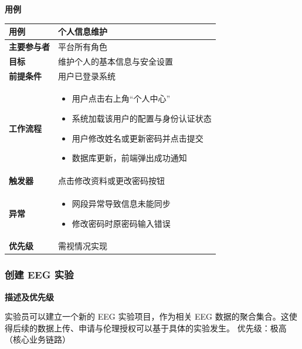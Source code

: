 \textbf{用例}
\begin{table}[H]
    \centering
    \begin{tabular}{|p{3cm}|p{11.5cm}|}
        \hline
        \textbf{用例} & 个人信息维护 \\
        \hline
        \textbf{主要参与者} & 平台所有角色 \\
        \hline
        \textbf{目标} & 维护个人的基本信息与安全设置 \\
        \hline
        \textbf{前提条件} & 用户已登录系统 \\
        \hline
        \textbf{工作流程} & 
        \vspace{-0.3cm}
        \begin{itemize}
            \item 用户点击右上角“个人中心”
            \item 系统加载该用户的配置与身份认证状态
            \item 用户修改姓名或更新密码并点击提交
            \item 数据库更新，前端弹出成功通知
        \end{itemize} \vspace{-0.3cm} \\
        \hline
        \textbf{触发器} & 点击修改资料或更改密码按钮 \\
        \hline
        \textbf{异常} &
        \vspace{-0.3cm}
        \begin{itemize}
            \item 网段异常导致信息未能同步
            \item 修改密码时原密码输入错误
        \end{itemize} \vspace{-0.3cm} \\
        \hline
        \textbf{优先级} & 需视情况实现 \\
        \hline
    \end{tabular}
\end{table}

\subsubsection{创建 EEG 实验}

\textbf{描述及优先级}

实验员可以建立一个新的 EEG 实验项目，作为相关 EEG 数据的聚合集合。这使得后续的数据上传、申请与伦理授权可以基于具体的实验发生。
优先级：极高（核心业务链路）

